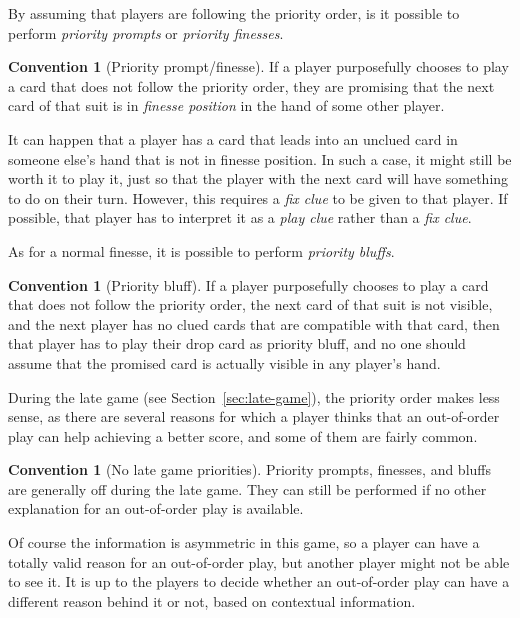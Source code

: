 \documentclass[a4paper]{article}
\theoremstyle{plain}
\theoremstyle{definition}
\newtheorem{convention}[theorem]{Convention}
\begin{document}
By assuming that players are following the priority order, is it possible to perform \emph{priority prompts} or \emph{priority finesses}.

\begin{convention}[Priority prompt/finesse]
	If a player purposefully chooses to play a card that does not follow the priority order, they are promising that the next card of that suit is in \emph{finesse position} in the hand of some other player.
\end{convention}

It can happen that a player has a card that leads into an unclued card in someone else's hand that is not in finesse position. In such a case, it might still be worth it to play it, just so that the player with the next card will have something to do on their turn. However, this requires a \emph{fix clue} to be given to that player. If possible, that player has to interpret it as a \emph{play clue} rather than a \emph{fix clue}.


As for a normal finesse, it is possible to perform \emph{priority bluffs}.

\begin{convention}[Priority bluff]
	If a player purposefully chooses to play a card that does not follow the priority order, the next card of that suit is not visible, and the next player has no clued cards that are compatible with that card, then that player has to play their drop card as priority bluff, and no one should assume that the promised card is actually visible in any player's hand.
\end{convention}

During the late game (see Section~\ref{sec:late-game}), the priority order makes less sense, as there are several reasons for which a player thinks that an out-of-order play can help achieving a better score, and some of them are fairly common.

\begin{convention}[No late game priorities]
	Priority prompts, finesses, and bluffs are generally off during the late game. They can still be performed if no other explanation for an out-of-order play is available.
\end{convention}

Of course the information is asymmetric in this game, so a player can have a totally valid reason for an out-of-order play, but another player might not be able to see it. It is up to the players to decide whether an out-of-order play can have a different reason behind it or not, based on contextual information.
\end{document}
